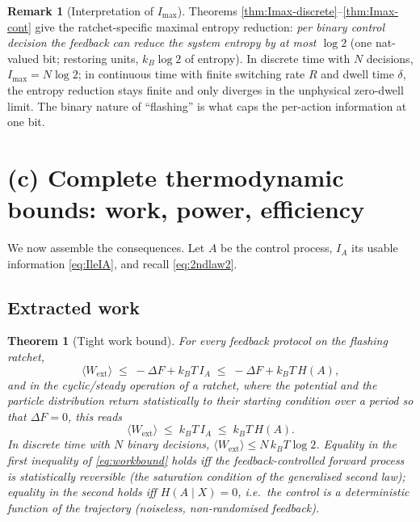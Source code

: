 \documentclass{amsart}
\newtheorem{theorem}{Theorem}
\theoremstyle{definition}
\newtheorem{remark}{Remark}
\newcommand{\kB}{k_{B}}
\newcommand{\Wext}{\langle W_{\mathrm{ext}}\rangle}
\begin{document}
\begin{remark}[Interpretation of $I_{\max}$]
Theorems \ref{thm:Imax-discrete}--\ref{thm:Imax-cont} give the
ratchet-specific maximal entropy reduction: \emph{per binary control decision
the feedback can reduce the system entropy by at most $\log 2$} (one nat-valued
bit; restoring units, $\kB\log2$ of entropy). In discrete time with $N$
decisions, $I_{\max}=N\log2$; in continuous time with finite switching rate
$R$ and dwell time $\delta$, the entropy reduction stays finite and only
diverges in the unphysical zero-dwell limit. The binary nature of ``flashing''
is what caps the per-action information at one bit.
\end{remark}

\section{(c) Complete thermodynamic bounds: work, power, efficiency}

We now assemble the consequences. Let $A$ be the control process, $I_A$ its
usable information \eqref{eq:IleIA}, and recall \eqref{eq:2ndlaw2}.

\subsection{Extracted work}

\begin{theorem}[Tight work bound]\label{thm:work}
For every feedback protocol on the flashing ratchet,
\begin{equation}\label{eq:workbound}
\Wext \;\le\; -\Delta F + \kB T\,I_A \;\le\; -\Delta F + \kB T\,H(A),
\end{equation}
and in the cyclic/steady operation of a ratchet, where the potential and the
particle distribution return statistically to their starting condition over a
period so that $\Delta F=0$, this reads
\begin{equation}\label{eq:workbound-cyclic}
\Wext \;\le\; \kB T\, I_A \;\le\; \kB T\, H(A).
\end{equation}
In discrete time with $N$ binary decisions, $\Wext\le N\,\kB T\log2$. Equality
in the first inequality of \eqref{eq:workbound} holds iff the feedback-controlled
forward process is statistically reversible (the saturation condition of the
generalised second law); equality in the second holds iff $H(A\mid X)=0$, i.e.\
the control is a deterministic function of the trajectory (noiseless,
non-randomised feedback).
\end{theorem}
\end{document}
